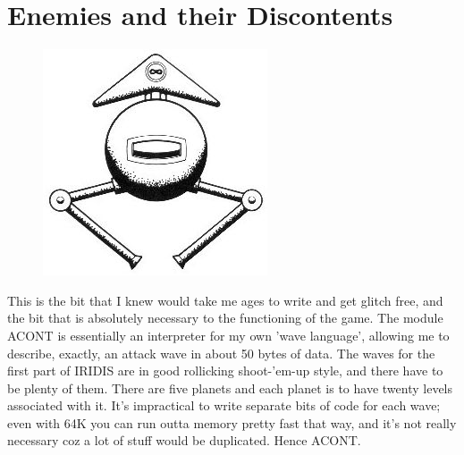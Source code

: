 \chapter{Enemies and their Discontents} 
\label{sec:level}

\lstset{style=6502Style}

\begin{definition}
\setlength{\intextsep}{0pt}%
\setlength{\columnsep}{3pt}%
\begin{figure}
\includegraphics[width=\linewidth]{src/callout/ia.jpg} 
\end{figure}
\small
This is the bit that I knew would take me ages to write and get glitch
free, and the bit that is absolutely necessary to the functioning of the game.
The module ACONT is essentially an interpreter for my own 'wave language',
allowing me to describe, exactly, an attack wave in about 50 bytes of data. The
waves for the first part of IRIDIS are in good rollicking shoot-'em-up style,
and there have to be plenty of them. There are five planets and each planet is
to have twenty levels associated with it. It's impractical to write separate
bits of code for each wave; even with 64K you can run outta memory pretty fast
that way, and it's not really necessary coz a lot of stuff would be duplicated.
Hence ACONT.
\end{definition}

